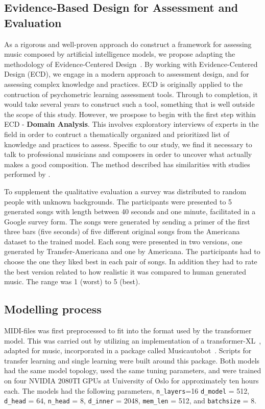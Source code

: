 \documentclass{IEEEtran}
\begin{document}
\subsection{Evidence-Based Design for Assessment and Evaluation}

As a rigorous and well-proven approach do construct a framework for assessing
music composed by artificial intelligence models, we propose adapting the
methodology of Evidence-Centered
Design~\cite{mislevy2003focus,mislevy2017evidence}.
By working with
Evidence-Centered Design (ECD), we engage in a modern approach to assessment
design, and for assessing complex knowledge and practices. ECD is originally
applied to the contruction of psychometric learning assessment tools. Through
to completion, it would take several years to construct such a tool,
something that is well outside the scope of this study. However, we prospose
to begin with the first step within ECD - \textbf{Domain Analysis}. This
involves exploratory interviews of experts in the field in order to contruct
a thematically organized and prioritized list of knowledge and practices to
assess. Specific to our study, we find it necessary to talk to professional
musicians and composers in order to uncover what actually makes a good
composition.
The method described has similarities with studies performed by \citeauthor{sturm2017taking}
\cite{sturm2017taking}.

To supplement the qualitative evaluation a survey was distributed to
random people with unknown backgrounds. The participants were presented to 5
generated songs with length between 40 seconds and one minute,
facilitated in a Google survey form.
The songs were generated by sending a primer of the first three bars
(five seconds) of five different original songs from the Americana dataset to the
trained model. Each song were presented in two versions, one generated by
Transfer-Americana and one by Americana. The participants had to choose the one they
liked best in each pair of songs. In addition they had to rate the best
version related to how realistic it was compared to human generated music.
The range was 1 (worst) to 5 (best).

\subsection{Modelling process}

MIDI-files was first preprocessed to fit into
the format used by the transformer model. This was carried out by utilizing
an implementation of a transformer-XL~\cite{dai2019transformerxl}, adapted for 
music, incorporated in a
package called Musicautobot~\cite{musicautobot}. Scripts for transfer learning
and single learning were built around this package. Both models had the same
model topology, used the same tuning parameters, and were trained on 
four NVIDIA 2080TI GPUs at University of Oslo for approximately ten 
hours each. The models had the following parameters, \lstinline|n_layers|=16
\lstinline|d_model| = 512, \lstinline|d_head| = 64,
\lstinline|n_head| = 8, \lstinline|d_inner| = 2048, \lstinline|mem_len| = 512,
and \lstinline|batchsize| = 8.
\end{document}
